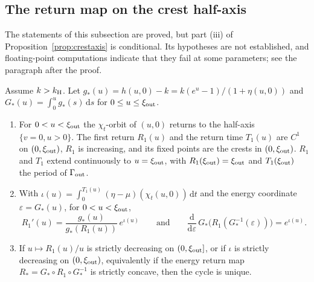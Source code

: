 \subsection{The return map on the crest half-axis}\label{att:sec:crestaxis}
The statements of this subsection are proved, but part (iii) of Proposition~\ref{prop:crestaxis} is conditional. Its hypotheses are not established, and floating-point computations indicate that they fail at some parameters; see the paragraph after the proof.

\begin{proposition}\label{prop:crestaxis}
Assume $k>k_{\mathrm H}$. Let $g_\ast(u)=h(u,0)-k=k(e^{u}-1)/(1+\eta(u,0))$ and $G_\ast(u)=\int_0^ug_\ast(s)\,\mathrm ds$ for $0\le u\le\xi_{\rm out}$.
\begin{enumerate}[label=\textup{(\roman*)}]
\item For $0<u<\xi_{\rm out}$ the $\chi_t$-orbit of $(u,0)$ returns to the half-axis $\{v=0,u>0\}$. The first return $R_1(u)$ and the return time $T_1(u)$ are $C^1$ on $(0,\xi_{\rm out})$, $R_1$ is increasing, and its fixed points are the crests in $(0,\xi_{\rm out})$. $R_1$ and $T_1$ extend continuously to $u=\xi_{\rm out}$, with $R_1(\xi_{\rm out})=\xi_{\rm out}$ and $T_1(\xi_{\rm out})$ the period of $\Gamma_{\rm out}$.
\item With $\iota(u)=\int_0^{T_1(u)}(\eta-\mu)(\chi_t(u,0))\,\mathrm dt$ and the energy coordinate $\varepsilon=G_\ast(u)$, for $0<u<\xi_{\rm out}$,
\begin{equation}\label{att:eq:returnderivative}
R_1'(u)=\frac{g_\ast(u)}{g_\ast(R_1(u))}\,e^{\iota(u)}\qquad\text{and}\qquad
\frac{\mathrm d}{\mathrm d\varepsilon}\,G_\ast\bigl(R_1(G_\ast^{-1}(\varepsilon))\bigr)=e^{\iota(u)}.
\end{equation}
\item If $u\mapsto R_1(u)/u$ is strictly decreasing on $(0,\xi_{\rm out}]$, or if $\iota$ is strictly decreasing on $(0,\xi_{\rm out})$, equivalently if the energy return map $R_\ast=G_\ast\circ R_1\circ G_\ast^{-1}$ is strictly concave, then the cycle is unique.
\end{enumerate}
\end{proposition}
